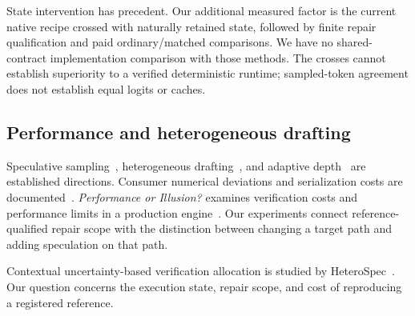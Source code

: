 State intervention has precedent. Our additional measured factor is the current native recipe crossed with naturally retained state, followed by finite repair qualification and paid ordinary/matched comparisons. We have no shared-contract implementation comparison with those methods. The crosses cannot establish superiority to a verified deterministic runtime; sampled-token agreement does not establish equal logits or caches.

\subsection{Performance and heterogeneous drafting}
Speculative sampling~\cite{leviathan2023}, heterogeneous drafting~\cite{dovetail,duodecoding}, and adaptive depth~\cite{turbospec,banditspec} are established directions. Consumer numerical deviations and serialization costs are documented~\cite{lossless}. \emph{Performance or Illusion?} examines verification costs and performance limits in a production engine~\cite{illusion}. Our experiments connect reference-qualified repair scope with the distinction between changing a target path and adding speculation on that path.

Contextual uncertainty-based verification allocation is studied by HeteroSpec~\cite{aclheterospec}. Our question concerns the execution state, repair scope, and cost of reproducing a registered reference.

